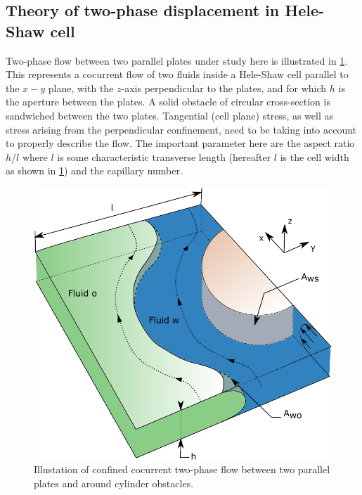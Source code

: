 \documentclass[]{article}
\begin{document}
\hypertarget{theory-of-two-phase-displacement-in-hele-shaw-cell}{%
\subsection{Theory of two-phase displacement in Hele-Shaw
cell}\label{theory-of-two-phase-displacement-in-hele-shaw-cell}}

Two-phase flow between two parallel plates under study here is
illustrated in \cref{fig:modelStudy}. This represents a cocurrent flow
of two fluids inside a Hele-Shaw cell parallel to the \(x-y\) plane,
with the \(z\)-axis perpendicular to the plates, and for which \(h\) is
the aperture between the plates. A solid obstacle of circular
cross-section is sandwiched between the two plates. Tangential (cell
plane) stress, as well as stress arising from the perpendicular
confinement, need to be taking into account to properly describe the
flow. The important parameter here are the aspect ratio \(h/l\) where
\(l\) is some characteristic transverse length (hereafter \(l\) is the
cell width as shown in \cref{fig:modelStudy}) and the capillary number.

\begin{figure}
\hypertarget{fig:modelStudy}{%
\centering
\includegraphics{figures/pdf/dessin_courbure.pdf}
\caption{Illustation of confined cocurrent two-phase flow between two
parallel plates and around cylinder obstacles.}\label{fig:modelStudy}
}
\end{figure}
\end{document}
